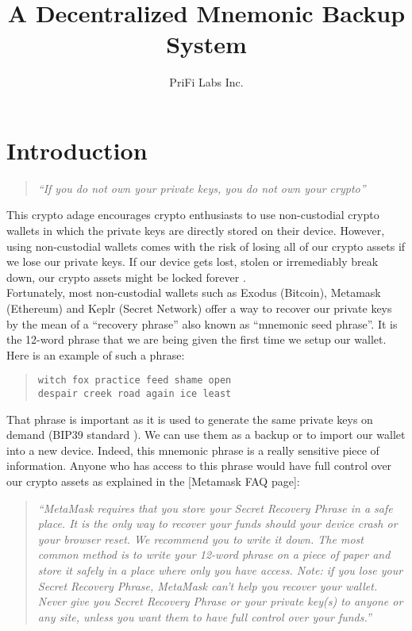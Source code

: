 \documentclass[12pt]{article}
\title{A Decentralized Mnemonic Backup System}
\author{PriFi Labs Inc.}
\date{}
\begin{document}
\maketitle

\begin{abstract}

\end{abstract}

\section{Introduction}

\begin{quote}
{\em ``If you do not own your private keys, you do not own your crypto''}
\end{quote}

This crypto adage encourages crypto enthusiasts to use non-custodial crypto wallets in which the private keys are directly stored on their device. However, using non-custodial wallets comes with the risk of losing all of our crypto assets if we lose our private keys. If our device gets lost, stolen or irremediably break down, our crypto assets might be locked forever \cite{LostPasswords}.\\

Fortunately, most non-custodial wallets such as Exodus (Bitcoin), Metamask (Ethereum) and Keplr (Secret Network) offer a way to recover our private keys by the mean of a ``recovery phrase'' also known as ``mnemonic seed phrase''. It is the 12-word phrase that we are being given the first time we setup our wallet. Here is an example of such a phrase: 

\begin{quote}
\begin{center}
{\tt witch fox practice feed shame open}\\
{\tt despair creek road again ice least}
\end{center}
\end{quote}

That phrase is important as it is used to generate the same private keys on demand (BIP39 standard \cite{BIP39}). We can use them as a backup or to import our wallet into a new device. Indeed, this mnemonic phrase is a really sensitive piece of information. Anyone who has access to this phrase would have full control over our crypto assets as explained in the [Metamask FAQ page]\cite{MetamaskFAQ}:

\begin{quote}
{\em ``MetaMask requires that you store your Secret Recovery Phrase in a safe place. It is the only way to recover your funds should your device crash or your browser reset. We recommend you to write it down. The most common method is to write your 12-word phrase on a piece of paper and store it safely in a place where only you have access. Note: if you lose your Secret Recovery Phrase, MetaMask can’t help you recover your wallet. Never give you Secret Recovery Phrase or your private key(s) to anyone or any site, unless you want them to have full control over your funds.''}\\
\end{quote}
\end{document}
